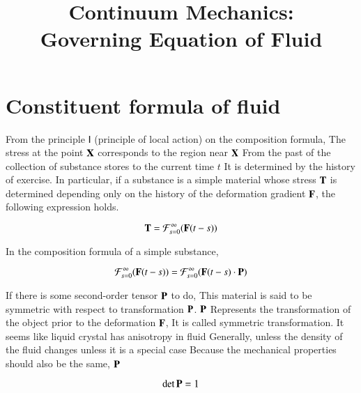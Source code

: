 

\title{Continuum Mechanics:\\Governing Equation of Fluid}



\maketitle

\tableofcontents


\section{Constituent formula of fluid}

From the principle Ⅰ (principle of local action) on the composition formula,
The stress at the point $\mathbf{X}$ corresponds to the region near $\mathbf{X}$
From the past of the collection of substance stores to the current time $t$
It is determined by the history of exercise.
%
In particular, if a substance is a simple material whose stress $\mathbf{T}$ is determined depending only on the history of the deformation gradient $\mathbf{F}$, the following expression holds.

\begin{equation}
{\mathbf{T}}=\mathcal{F}_{s=0}^{\infty}({\mathbf{F}}(t-s))
\end{equation}

In the composition formula of a simple substance,

\begin{equation}
\mathcal{F}_{s=0}^{\infty}({\mathbf{F}}(t-s))
=\mathcal{F}_{s=0}^{\infty}({\mathbf{F}}(t-s) \cdot {\mathbf{P}})
\end{equation}

If there is some second-order tensor $\mathbf{P}$ to do,
This material is said to be symmetric with respect to transformation $\mathbf{P}$. $\mathbf{P}$
Represents the transformation of the object prior to the deformation $\mathbf{F}$,
It is called symmetric transformation.
It seems like liquid crystal has anisotropy in fluid
Generally, unless the density of the fluid changes unless it is a special case
Because the mechanical properties should also be the same, $\mathbf{P}$

\begin{equation}
\det{\mathbf{P}}=1
\end{equation}


